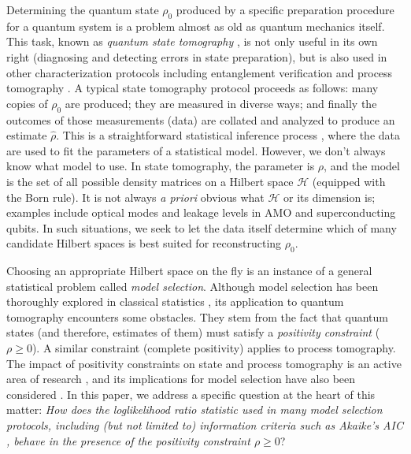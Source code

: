 \documentclass[aps,pra, twocolumn]{revtex4-1}
\newcommand{\cH}{\mathcal{H}}
\newcommand{\rhohat}{\hat{\rho}}
\begin{document}
Determining the quantum state $\rho_{0}$ produced by a specific preparation procedure for a quantum system is a problem almost as old as quantum mechanics itself. This task, known as \emph{quantum state tomography} \cite{Paris2004}, is not only useful in its own right (diagnosing and detecting errors in state preparation), but is also used in other characterization protocols including entanglement verification \cite{Steffen2006, Blume-Kohout2010c, VanEnk2007} and process tomography \cite{Anis2012}. A typical state tomography protocol proceeds as follows: many copies of $\rho_{0}$ are produced; they are measured in diverse ways; and finally the outcomes of those measurements (data) are collated and analyzed to produce an estimate $\rhohat$.  This is a straightforward statistical inference process \cite{Reid2015, Wasserman2004}, where the data are used to fit the parameters of a statistical model.  However, we don't always know what model to use.  In state tomography, the parameter is $\rho$, and the model is the set of all possible density matrices on a Hilbert space $\cH$ (equipped with the Born rule). It is not always \emph{a priori} obvious what $\cH$ or its dimension is; examples include optical modes \cite{Altepeter2005, Bertrand1987, Lvovsky2009, Breitenbach1997, Leonhardt1995} and leakage levels in AMO and superconducting \cite{Motzoi2009, Fazio1999} qubits. In such situations, we seek to let the data itself determine which of many candidate Hilbert spaces is best suited for reconstructing $\rho_{0}$.

Choosing an appropriate Hilbert space on the fly is an instance of a general statistical problem called \emph{model selection}.  Although model selection has been thoroughly explored in classical statistics \cite{Burnham2004}, its application to quantum tomography encounters some obstacles.  They stem from the fact that quantum states (and therefore, estimates of them) must satisfy a \emph{positivity constraint} ($\rho\geq0$).  A similar constraint (complete positivity) applies to process tomography.  The impact of positivity constraints on state and process tomography is an active area of research \cite{Candes2006, Flammia2012a, Suess2016, Carpentier2015}, and its implications for model selection have also been considered \cite{Schwarz2013a, Guta2012a, VanEnk2013a, Langford2013, Yin2011, Moroder2013, Knips2015}.  In this paper, we address a specific question at the heart of this matter:  \emph{How does the loglikelihood ratio statistic used in many model selection protocols, including (but not limited to) information criteria such as Akaike's AIC \cite{Akaike1974}, behave in the presence of the positivity constraint $\rho\geq0$}? 
\end{document}
